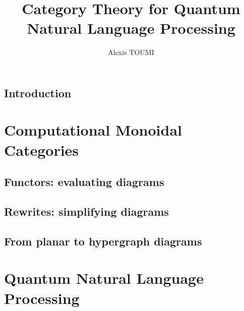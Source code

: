 

\title{Category Theory for Quantum\\
Natural Language Processing}
\author{Alexis TOUMI}

\degreedate{\today}


\begin{romanpages}
\maketitle

\begin{acknowledgements}\end{acknowledgements}

\begin{abstract}\end{abstract}

\tableofcontents

\end{romanpages}

\chapter*{Introduction}

\part{Computational Monoidal Categories}


\chapter{Functors: evaluating diagrams}
\chapter{Rewrites: simplifying diagrams}
\chapter{From planar to hypergraph diagrams}

\part{Quantum Natural Language Processing}

